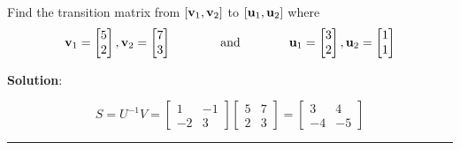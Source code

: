 \begin{example}
	Find the transition matrix from $[{\bf v}_1, {\bf v}_2]$ to $[{\bf u}_1, {\bf u}_2]$ where 
	\[  {\bf v}_1 =  \begin{bmatrix}  5 \\ 2  \end{bmatrix},      {\bf v}_2 = \begin{bmatrix} 7 \\ 3 \end{bmatrix} \hspace{0.5in} \text{ and }  \hspace{0.5in}   {\bf u}_1 =  \begin{bmatrix}  3 \\ 2  \end{bmatrix},      {\bf u}_2 = \begin{bmatrix} 1 \\ 1 \end{bmatrix}  \]
	
	\textbf{Solution}:   
	
	
	\[ S =  U^{-1} V =  \begin{bmatrix}  1 & -1 \\ -2 & 3   \end{bmatrix}    \begin{bmatrix}  5 & 7 \\ 2 & 3   \end{bmatrix}   =  \begin{bmatrix}  3 & 4 \\ -4 & -5   \end{bmatrix}  \]
\end{example}



\rule[0.01in]{\textwidth}{0.0025in}




